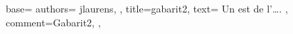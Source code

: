 {
  base={
    authors={
      jlaurens,
    },
    title=gabarit2,
    text={
      Un  est  de l'…. %
    },
    comment={Gabarit2},
  },
}
